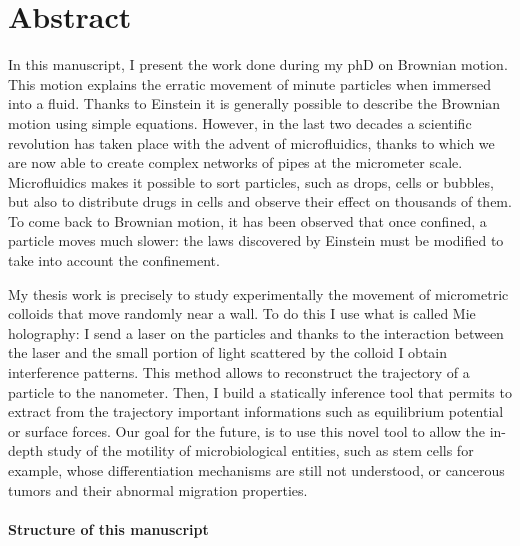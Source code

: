\section*{Abstract}

In this manuscript, I present the work done during my phD on Brownian motion. This motion explains the erratic movement of minute particles when immersed into a fluid. Thanks to Einstein it is generally possible to describe the Brownian motion using simple equations. However, in the last two decades a scientific revolution has taken place with the advent of microfluidics, thanks to which we are now able to create complex networks of pipes at the micrometer scale. Microfluidics makes it possible to sort particles, such as drops, cells or bubbles, but also to distribute drugs in cells and observe their effect on thousands of them. To come back to Brownian motion, it has been observed that once confined, a particle moves much slower: the laws discovered by Einstein must be modified to take into account the confinement.

My thesis work is precisely to study experimentally the movement of micrometric colloids that move randomly near a wall. To do this I use what is called Mie holography: I send a laser on the particles and thanks to the interaction between the laser and the small portion of light scattered by the colloid I obtain interference patterns. This method allows to reconstruct the trajectory of a particle to the nanometer. Then, I build a statically inference tool that permits to extract from the trajectory important informations such as equilibrium potential or surface forces.  Our goal for the future, is to use this novel tool to allow the in-depth study of the motility of microbiological entities, such as stem cells for example, whose differentiation mechanisms are still not understood, or cancerous tumors and their abnormal migration properties.

\paragraph*{Structure of this manuscript}\mbox{}\\

